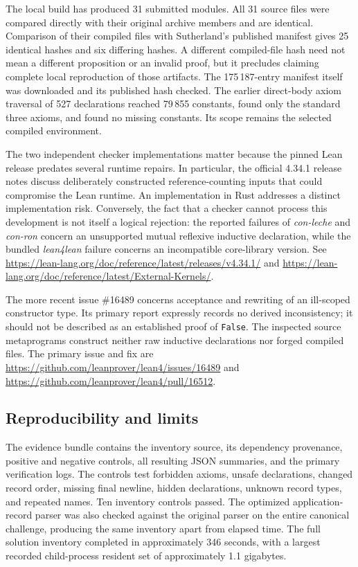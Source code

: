 \documentclass[11pt,a4paper]{article}
\theoremstyle{remark}
\begin{document}
The local build has produced 31 submitted modules.  All 31 source files were
compared directly with their original archive members and are identical.
Comparison of their compiled files with Sutherland's published manifest gives
25 identical hashes and six differing hashes.  A different compiled-file
hash need not mean a different proposition or an invalid proof, but it
precludes claiming complete local reproduction of those artifacts.  The
175\,187-entry manifest itself was downloaded and its published hash checked.
The earlier direct-body axiom traversal of 527 declarations reached 79\,855
constants, found only the standard three axioms, and found no missing
constants.  Its scope remains the selected compiled environment.

The two independent checker implementations matter because the pinned Lean
release predates several runtime repairs.  In particular, the official
4.34.1 release notes discuss deliberately constructed reference-counting
inputs that could compromise the Lean runtime.  An implementation in Rust
addresses a distinct implementation risk.  Conversely, the fact that a
checker cannot process this development is not itself a logical rejection:
the reported failures of \emph{con-leche} and \emph{con-ron} concern an
unsupported mutual reflexive inductive declaration, while the bundled
\emph{lean4lean} failure concerns an incompatible core-library version.
See \url{https://lean-lang.org/doc/reference/latest/releases/v4.34.1/}
and \url{https://lean-lang.org/doc/reference/latest/External-Kernels/}.

The more recent issue \#16489 concerns acceptance and rewriting of an
ill-scoped constructor type.  Its primary report expressly records no derived
inconsistency; it should not be described as an established proof of
\texttt{False}.  The inspected source metaprograms construct neither raw
inductive declarations nor forged compiled files.  The primary issue and fix
are \url{https://github.com/leanprover/lean4/issues/16489} and
\url{https://github.com/leanprover/lean4/pull/16512}.

\subsection{Reproducibility and limits}

The evidence bundle contains the inventory source, its dependency provenance,
positive and negative controls, all resulting JSON summaries, and the primary
verification logs.  The controls test forbidden axioms, unsafe declarations,
changed record order, missing final newline, hidden declarations, unknown
record types, and repeated names.  Ten inventory controls passed.  The
optimized application-record parser was also checked against the original
parser on the entire canonical challenge, producing the same inventory apart
from elapsed time.  The full solution inventory completed in approximately
346 seconds, with a largest recorded child-process resident set of approximately 1.1 gigabytes.
\end{document}
